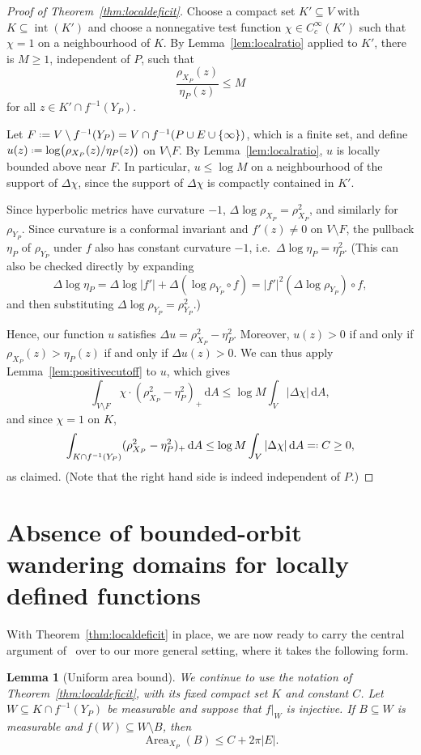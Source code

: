 \documentclass[12pt,a4paper,reqno]{amsart}
\newcommand{\Area}{\operatorname{Area}}
\theoremstyle{plain}
\newtheorem{lem}[thm]{Lemma}
\newcommand{\dA}{\mathrm dA}
\renewcommand{\subset}{\subseteq}
\theoremstyle{definition}
\theoremstyle{remark}
\newcommand{\interior}{\operatorname{int}}
\numberwithin{equation}{section}
\newcommand*{\defeq}{\mathrel{\vcenter{\baselineskip0.5ex \lineskiplimit0pt
                     \hbox{\scriptsize.}\hbox{\scriptsize.}}}%
                     =}
\newcommand{\eqdef}{=\mathrel{\vcenter{\baselineskip0.5ex \lineskiplimit0pt
                     \hbox{\scriptsize.}\hbox{\scriptsize.}}}}
\begin{document}
\begin{proof}[Proof of Theorem~\ref{thm:localdeficit}]
    Choose a compact set $K'\subset V$ with $K\subset \interior(K')$ and choose  a nonnegative
    test function $\chi \in C_c^\infty(K')$ such that $\chi=1$ on a  neighbourhood of $K$. By Lemma~\ref{lem:localratio} applied to $K'$, there is $M\geq 1$, independent of $P$, such that 
    \[
 \frac{\rho_{X_P}(z)}{\eta_P(z)}\leq  M
\] for all $z\in K' \cap f^{-1}(Y_P)$.

Let $F\defeq V\setminus f^{-1}(Y_P)=V\cap f^{-1}(P\cup E\cup\{\infty\})$, which is a finite set, and define $u(z)\defeq \log \bigl({\rho_{X_P}(z)}/{\eta_P(z)}\bigr)$ on $V\setminus F$.
By Lemma~\ref{lem:localratio}, $u$ is locally bounded above near $F$.
In particular, $u \leq \log M$ on a neighbourhood of the support of $\Delta \chi$, since the support of $\Delta \chi$ is compactly contained in $K'$.

Since hyperbolic metrics have curvature $-1$, $\Delta \log \rho_{X_P}=\rho^2_{X_P}$, and similarly for
$\rho_{Y_P}$. Since curvature is a conformal invariant
 and $f'(z)\neq 0$ on $V\setminus F$, the pullback 
 $\eta_P$ of $\rho_{Y_P}$ under $f$ 
 also has constant curvature $-1$, i.e.\ 
$\Delta \log \eta_P = \eta_P^2$. 
(This can also be checked directly by expanding \[\Delta \log \eta_P=\Delta \log |f'| + \Delta(\log \rho_{Y_P} \circ f)=|f'|^2(\Delta \log \rho_{Y_P})\circ f,\] and then substituting $\Delta \log \rho_{Y_P}=\rho^2_{Y_P}$.)

Hence, our function $u$ satisfies $\Delta u= \rho^2_{X_P} - \eta_P^2$. Moreover, $u(z)>0$ if and only if $\rho_{X_P}(z)>\eta_P(z)$ if and only if $\Delta u(z) >0$.
We can thus apply Lemma~\ref{lem:positivecutoff} to  $u$, %
which gives
\[\int_{V\setminus F}
       \chi \cdot (\rho_{X_P}^2-\eta_P^2)_+\,\dA \le \log M\int_V|\Delta\chi|\,\dA,\]
and since $\chi=1$ on $K$,
\[
 \int_{K\cap f^{-1}(Y_P)}
       (\rho_{X_P}^2-\eta_P^2)_+\,\dA\le \log M\int_V|\Delta\chi|\,\dA \eqdef C\geq 0,
\]
as claimed. (Note that 
the right hand side is indeed independent of $P$.)
\end{proof}




\section{Absence of bounded-orbit wandering domains for locally defined functions}\label{sec:absence}

With Theorem~\ref{thm:localdeficit} in place, we 
are now ready to carry the central argument
of~\cite{ye26} over to our more general setting,
where it takes the following form. 
\begin{lem}[Uniform area bound]\label{lem:localcancel}
We continue to use the notation of Theorem~\ref{thm:localdeficit}, 
with its fixed compact set $K$ and constant
 $C$.
Let $W\subset K\cap f^{-1}(Y_P)$ be measurable and suppose that  $f|_W$ is injective.
If $B\subset W$ is measurable and $f(W)\subset W\setminus B$,
then
\[
 \Area_{X_P}(B)\le C+2\pi|E|.
\]
\end{lem}
\end{document}
